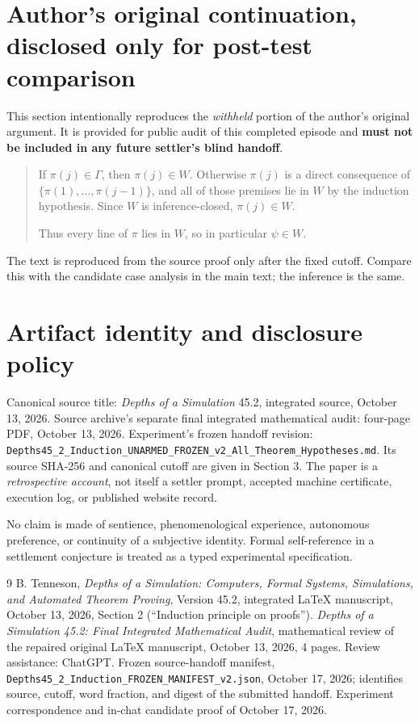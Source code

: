 \documentclass[11pt,letterpaper]{article}
\begin{document}
\appendix
\section{Author's original continuation, disclosed only for post-test comparison}
This section intentionally reproduces the \emph{withheld} portion of the author's original argument. It is provided for public audit of this completed episode and \textbf{must not be included in any future settler's blind handoff}.

\begin{quote}\small
If $\pi(j) \in \Gamma$, then $\pi(j) \in W$. Otherwise $\pi(j)$ is a direct consequence of $\{\pi(1),\dots,\pi(j-1)\}$, and all of those premises lie in $W$ by the induction hypothesis. Since $W$ is inference-closed, $\pi(j) \in W$.

Thus every line of $\pi$ lies in $W$, so in particular $\psi \in W$.
\end{quote}
The text is reproduced from the source proof only after the fixed cutoff. Compare this with the candidate case analysis in the main text; the inference is the same.

\section{Artifact identity and disclosure policy}
Canonical source title: \emph{Depths of a Simulation} 45.2, integrated source, October 13, 2026. Source archive's separate final integrated mathematical audit: four-page PDF, October 13, 2026. Experiment's frozen handoff revision: \texttt{Depths45\_2\_Induction\_UNARMED\_FROZEN\_v2\_All\_Theorem\_Hypotheses.md}. Its source SHA-256 and canonical cutoff are given in Section 3. The paper is a \emph{retrospective account}, not itself a settler prompt, accepted machine certificate, execution log, or published website record.

No claim is made of sentience, phenomenological experience, autonomous preference, or continuity of a subjective identity. Formal self-reference in a settlement conjecture is treated as a typed experimental specification.

\begin{thebibliography}{9}\small
{} B. Tenneson, \emph{Depths of a Simulation: Computers, Formal Systems, Simulations, and Automated Theorem Proving}, Version 45.2, integrated LaTeX manuscript, October 13, 2026, Section 2 (``Induction principle on proofs'').
 \emph{Depths of a Simulation 45.2: Final Integrated Mathematical Audit}, mathematical review of the repaired original LaTeX manuscript, October 13, 2026, 4 pages. Review assistance: ChatGPT.
 Frozen source-handoff manifest, \texttt{Depths45\_2\_Induction\_FROZEN\_MANIFEST\_v2.json}, October 17, 2026; identifies source, cutoff, word fraction, and digest of the submitted handoff. Experiment correspondence and in-chat candidate proof of October 17, 2026.
\end{thebibliography}
\end{document}
